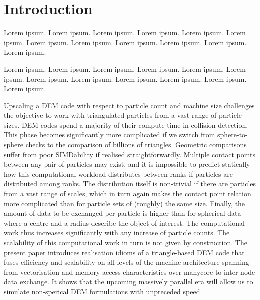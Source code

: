 \section{Introduction}

Lorem ipsum. Lorem ipsum. Lorem ipsum. Lorem ipsum. Lorem ipsum. Lorem ipsum.
Lorem ipsum. Lorem ipsum. Lorem ipsum. Lorem ipsum. Lorem ipsum. Lorem ipsum. 

Lorem ipsum.
Lorem ipsum.
Lorem ipsum. Lorem ipsum. Lorem ipsum. Lorem ipsum.
Lorem ipsum. Lorem ipsum. Lorem ipsum. Lorem ipsum. Lorem ipsum. Lorem ipsum. 

Upscaling a DEM code with respect to particle count and machine size 
challenges the objective to work with triangulated particles from a vast range
of particle sizes.
DEM codes spend a majority of their compute time in collision detection.
This phase becomes significantly more complicated if we switch from
sphere-to-sphere checks to the comparison of billions of triangles.
Geometric comparisons suffer from poor SIMDability if realised
straightforwardly.
Multiple contact points between any pair of particles may exist, and it is
impossible to predict statically how this computational workload distributes
between ranks if particles are distributed among ranks. 
The distribution itself is non-trivial if there are particles from a vast range
of scales, which in turn again makes the contact point relation more complicated
than for particle sets of (roughly) the same size.
Finally, the amount of data to be exchanged per particle is higher
than for spherical data where a centre and a radius describe the object of interest. 
The computational work thus increases significantly with any increase of
particle counts.
The scalability of this computational work in turn is not given by construction.
The present paper introduces realisation idioms of a triangle-based DEM code
that fuses efficiency and scalability on all levels of the machine architecture spanning from
vectorisation and memory access characteristics over manycore to inter-node
data exchange.
It shows that the upcoming massively parallel era will allow us to
simulate non-sperical DEM formulations with unpreceded speed.   

